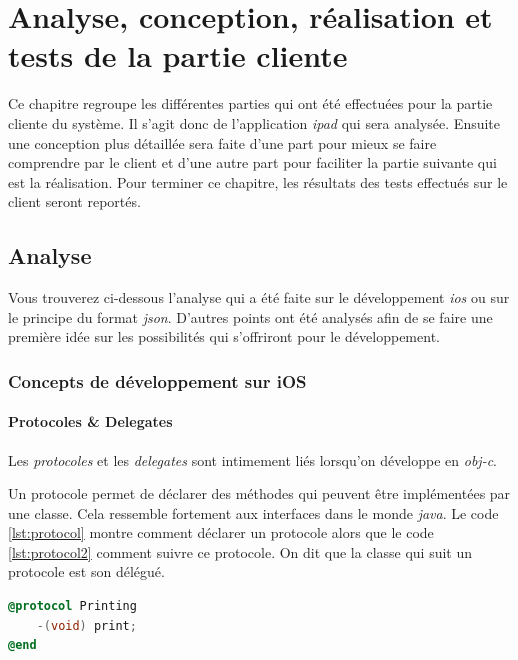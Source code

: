 \chapter{Analyse, conception, réalisation et tests de la partie cliente}
\label{cha:analyse_client}

Ce chapitre regroupe les différentes parties qui ont été effectuées pour la partie cliente du système. Il s'agit donc de l'application \emph{\gls{ipad}} qui sera analysée. Ensuite une conception plus détaillée sera faite d'une part pour mieux se faire comprendre par le client et d'une autre part pour faciliter la partie suivante qui est la réalisation. Pour terminer ce chapitre, les résultats des tests effectués sur le client seront reportés.

\section{Analyse} %
\label{sec:analyse_client}
Vous trouverez ci-dessous l'analyse qui a été faite sur le développement \emph{\gls{ios}} ou sur le principe du format \emph{\gls{json}}. D'autres points ont été analysés afin de se faire une première idée sur les possibilités qui s'offriront pour le développement.
\subsection{Concepts de développement sur iOS} %
\label{sub:concepts_de_d_veloppement_sur_ios}

\subsubsection{Protocoles \& Delegates}
Les \emph{protocoles} et les \emph{delegates} sont intimement liés lorsqu'on développe en \emph{\gls{obj-c}}.

\medskip 

Un protocole permet de déclarer des méthodes qui peuvent être implémentées par une classe. Cela ressemble fortement aux interfaces dans le monde \emph{\gls{java}}. Le code \ref{lst:protocol} montre comment déclarer un protocole alors que le code \ref{lst:protocol2} comment suivre ce protocole. On dit que la classe qui suit un protocole est son délégué.

\begin{lstlisting}[language={C}, caption={Déclarer un protocole Printing}, label={lst:protocol}]
@protocol Printing
	-(void) print;
@end
\end{lstlisting}

